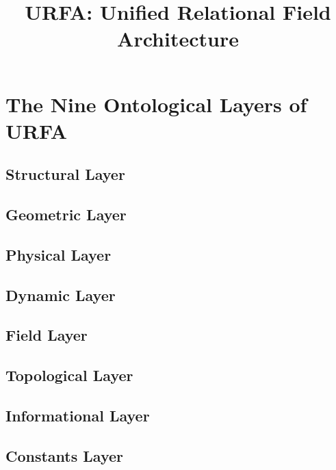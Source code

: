 \documentclass[12pt]{article}
\begin{document}

\title{URFA: Unified Relational Field Architecture}
\author{}
\date{}
\maketitle

\tableofcontents
\newpage





\section{The Nine Ontological Layers of URFA}

\subsection{Structural Layer}
\subsection{Geometric Layer}
\subsection{Physical Layer}
\subsection{Dynamic Layer}
\subsection{Field Layer}
\subsection{Topological Layer}
\subsection{Informational Layer}
\subsection{Constants Layer}
\end{document}
